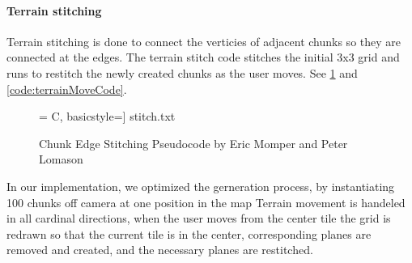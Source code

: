 \documentclass[a4paper,10pt]{article}
\begin{document}
\paragraph{Terrain stitching}
Terrain stitching is done to connect the verticies of adjacent chunks so they are connected at the edges. The terrain stitch code stitches the initial 3x3 grid and runs to restitch the newly created chunks as the user moves. See \ref{code:terrainStitchCode} and \ref{code:terrainMoveCode}.
\begin{figure}[H]
	\centerline{ = C, basicstyle=\small] {stitch.txt} }
	\caption{Chunk Edge Stitching Pseudocode by Eric Momper and Peter Lomason}
	\label{code:terrainStitchCode}
\end{figure}
\pagebreak
In our implementation, we optimized the gerneration process, by instantiating 100 chunks off camera at one position in the map 
Terrain movement is handeled in all cardinal directions, when the user moves from the center tile the grid is redrawn so that the current tile is in the center, corresponding planes are removed and created, and the necessary planes are restitched. 
\end{document}

